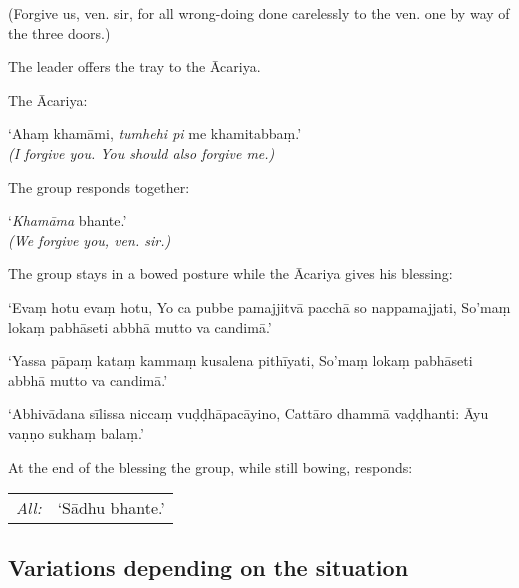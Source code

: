 \begin{english}
  (Forgive us, ven. sir, for all wrong-doing done carelessly to the ven. one by way of the three doors.)
\end{english}

The leader offers the tray to the Ācariya.

The Ācariya:

\vspace*{\parskip}

\begin{paritta}
  ‘Ahaṃ khamāmi, \emph{tumhehi pi} me khamitabbaṃ.’\\
  \emph{(I forgive you. You should also forgive me.)}
\end{paritta}

The group responds together:

\vspace*{\parskip}

\begin{paritta}
  ‘\emph{Khamāma} bhante.’\\
  \emph{(We forgive you, ven. sir.)}
\end{paritta}

The group stays in a bowed posture while the Ācariya gives his blessing:

\vspace*{\parskip}

\begin{paritta}
  ‘Evaṃ hotu evaṃ hotu, Yo ca pubbe pamajjitvā pacchā so nappamajjati, So'maṃ
  lokaṃ pabhāseti abbhā mutto va candimā.’

  ‘Yassa pāpaṃ kataṃ kammaṃ kusalena pithīyati, So'maṃ lokaṃ pabhāseti abbhā
  mutto va candimā.’

  ‘Abhivādana sīlissa niccaṃ vuḍḍhāpacāyino, Cattāro dhammā vaḍḍhanti: Āyu vaṇṇo
  sukhaṃ balaṃ.’

\end{paritta}

At the end of the blessing the group, while still bowing, responds:

\begin{tabular}{@{}L{3em}L{10em}@{}}
\hspace*{1.5em}\emph{All:} & ‘Sādhu bhante.’\\
\end{tabular}

\subsection*{Variations depending on the situation}

